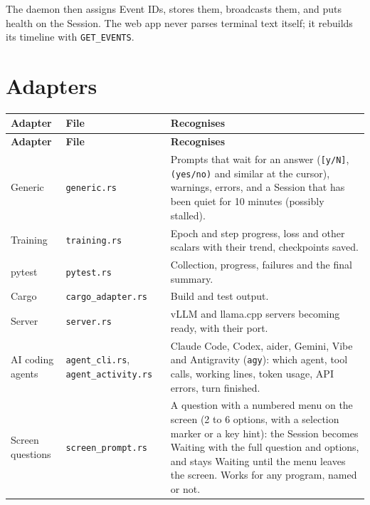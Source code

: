 The daemon then assigns Event IDs, stores them, broadcasts them, and puts health on the Session. The web app never parses terminal text itself; it rebuilds its timeline with \texttt{GET\_\allowbreak{}EVENTS}.

\section{\texorpdfstring{Adapters}{Adapters}}

\begin{small}
\begin{longtable}{>{\raggedright\arraybackslash}p{0.146\dimexpr \linewidth-6\tabcolsep\relax}>{\raggedright\arraybackslash}p{0.273\dimexpr \linewidth-6\tabcolsep\relax}>{\raggedright\arraybackslash}p{0.581\dimexpr \linewidth-6\tabcolsep\relax}}
\toprule
\textbf{Adapter} & \textbf{File} & \textbf{Recognises} \\
\midrule
\endfirsthead
\toprule
\textbf{Adapter} & \textbf{File} & \textbf{Recognises} \\
\midrule
\endhead
Generic & \texttt{generic.\allowbreak{}rs} & Prompts that wait for an answer (\texttt{[y/\allowbreak{}N]}, \texttt{(yes/\allowbreak{}no)} and similar at the cursor), warnings, errors, and a Session that has been quiet for 10 minutes (possibly stalled). \\
Training & \texttt{training.\allowbreak{}rs} & Epoch and step progress, loss and other scalars with their trend, checkpoints saved. \\
pytest & \texttt{pytest.\allowbreak{}rs} & Collection, progress, failures and the final summary. \\
Cargo & \texttt{cargo\_\allowbreak{}adapter.\allowbreak{}rs} & Build and test output. \\
Server & \texttt{server.\allowbreak{}rs} & vLLM and llama.cpp servers becoming ready, with their port. \\
AI coding agents & \texttt{agent\_\allowbreak{}cli.\allowbreak{}rs}, \texttt{agent\_\allowbreak{}activity.\allowbreak{}rs} & Claude Code, Codex, aider, Gemini, Vibe and Antigravity (\texttt{agy}): which agent, tool calls, working lines, token usage, API errors, turn finished. \\
Screen questions & \texttt{screen\_\allowbreak{}prompt.\allowbreak{}rs} & A question with a numbered menu on the screen (2 to 6 options, with a selection marker or a key hint): the Session becomes Waiting with the full question and options, and stays Waiting until the menu leaves the screen. Works for any program, named or not. \\

\end{longtable}
\end{small}
